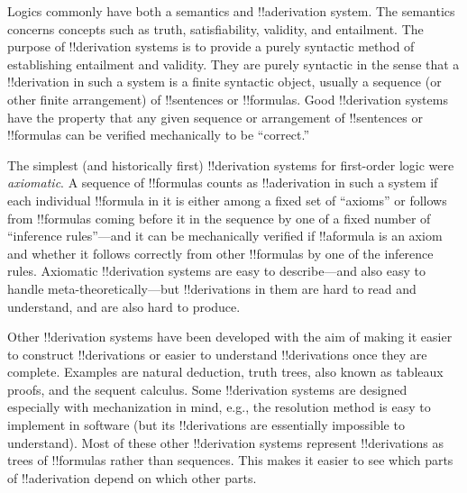 \documentclass[../../../include/open-logic-section]{subfiles}
\begin{document}
      {}
      {}


Logics commonly have both a semantics and !!a{derivation}
system. The semantics concerns concepts such as truth, satisfiability,
validity, and entailment.  The purpose of !!{derivation} systems is to
provide a purely syntactic method of establishing entailment and
validity.  They are purely syntactic in the sense that a
!!{derivation} in such a system is a finite syntactic object, usually
a sequence (or other finite arrangement) of !!{sentence}s or
!!{formula}s.  Good !!{derivation} systems have the property that any
given sequence or arrangement of !!{sentence}s or !!{formula}s can be
verified mechanically to be ``correct.''

The simplest (and historically first) !!{derivation} systems for
first-order logic were \emph{axiomatic}.  A sequence of !!{formula}s
counts as !!a{derivation} in such a system if each individual
!!{formula} in it is either among a fixed set of ``axioms'' or follows
from !!{formula}s coming before it in the sequence by one of a fixed
number of ``inference rules''---and it can be mechanically verified if
!!a{formula} is an axiom and whether it follows correctly from other
!!{formula}s by one of the inference rules.  Axiomatic !!{derivation}
systems are easy to describe---and also easy to handle
meta-theoretically---but !!{derivation}s in them are hard to read and
understand, and are also hard to produce.

Other !!{derivation} systems have been developed with the aim of
making it easier to construct !!{derivation}s or easier to understand
!!{derivation}s once they are complete.  Examples are natural
deduction, truth trees, also known as tableaux proofs, and the sequent
calculus.  Some !!{derivation} systems are designed especially with
mechanization in mind, e.g., the resolution method is easy to
implement in software (but its !!{derivation}s are essentially
impossible to understand). Most of these other !!{derivation} systems
represent !!{derivation}s as trees of !!{formula}s rather than
sequences. This makes it easier to see which parts of !!a{derivation}
depend on which other parts.
\end{document}
